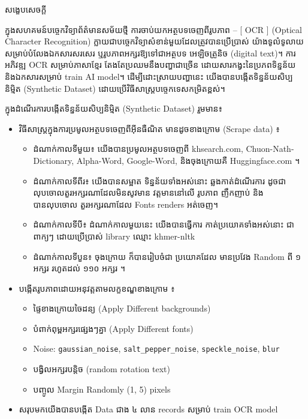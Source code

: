 \begin{adjustwidth}{0.2cm}{0.2cm}

    \begin{center}
        {\khmerfont\fontsize{15pt}{25pt}\selectfont សង្ខេបសេចក្ដី \par}
    \end{center}
    \label{khmer-abstract}
    \vspace{0.5cm}
    \khmernormal
    \small
    ក្នុងសហគមន៍បច្ចេកវិទ្យាព័ត៌មានសម័យថ្មី ការចាប់យកអត្ថបទចេញពីរូបភាព  – [ OCR ]
    (Optical Character Recognition) ក្លាយជាបច្ចេកវិទ្យាសំខាន់មួយដែលត្រូវបានប្រើប្រាស់
    យ៉ាងទូលំទូលាយ សម្រាប់បំលែងឯកសារសរសេរ ឬរូបភាពអក្សរឱ្យទៅជាអត្ថបទ អេឡិចត្រូនិច (digital text)។ 
    ការអភិវឌ្ឍ OCR សម្រាប់ភាសាខ្មែរ តែងតែប្រឈមនឹងបញ្ហាជាច្រើន ដោយសារកង្វះនៃប្រភពទិន្នន័យ 
    និងឯកសារសម្រាប់ train AI model។ ដើម្បីដោះស្រាយបញ្ហានេះ យើងបានបង្កើតទិន្នន័យសិប្បនិម្មិត 
    (Synthetic Dataset) ដោយប្រើវិធីសាស្ត្របច្ចេកទេសកម្រិតខ្ពស់។\par
    
    ក្នុងដំណើរការបង្កើតទិន្នន័យសិប្បនិម្មិត (Synthetic Dataset) រួមមាន៖
    \begin{itemize}
        \item វិធីសាស្ដ្រក្នុងការប្រមូលអត្ថបទចេញពីអ៊ីនធឺណិត មានដូចខាងក្រោម (Scrape data) ៖
        \begin{itemize}
            \item ដំណាក់កាលទីមួយ៖ យើងបានប្រមូលអត្ថបទចេញពី khsearch.com, Chuon-Nath-Dictionary, Alpha-Word, Google-Word, និងចុងក្រោយគឺ Huggingface.com ។
            \item ដំណាក់កាលទីពីរ៖ យើងបានសម្អាត ទិន្នន័យទាំងអស់នោះ ឆ្លងកាត់ដំណើរការ ដូចជា លុបចោលតួរអក្សរណាដែលមិនសូវមាន វត្តមាននៅលើ រូបភាព ញឹកញាប់ និងបានលុបចោល តួរអក្សរណាដែល Fonts renders អត់ចេញ។
            \item ដំណាក់កាលទីបី៖ ដំណាក់កាលមួយនេះ យើងបានធ្វើការ កាត់ប្រយោគទាំងអស់នោះ ជាពាក្យៗ ដោយប្រើប្រាស់ library ឈ្មោះ khmer-nltk
            \item ដំណាក់កាលទីបួន៖ ចុងក្រោយ ក៏បានរៀបចំជា ប្រយោគដែល មានប្រវែង Random ពី ១ អក្សរ រហូតដល់ ១១០ អក្សរ ។
        \end{itemize}
        \item បង្កើតរូបភាពដោយអនុវត្តតាមលក្ខខណ្ឌខាងក្រោម ៖ 
        \begin{itemize}
            \item ផ្ទៃខាងក្រោយចៃដន្យ (Apply Different backgrounds)
            \item បំពាក់ពុម្ពអក្សរផ្សេងៗគ្នា (Apply Different fonts)
            \item Noise: \texttt{gaussian\_noise}, \texttt{salt\_pepper\_noise}, \texttt{speckle\_noise}, \texttt{blur}
            \item បង្វិលអក្សរបន្តិច (random rotation text)
            \item បញ្ចូល Margin Randomly (1, 5) pixels
        \end{itemize}
        \item សរុបមកយើងបានបង្កើត Data ជាង ៤ លាន records សម្រាប់ train OCR model
    \end{itemize}
    \par
    

\end{adjustwidth}
